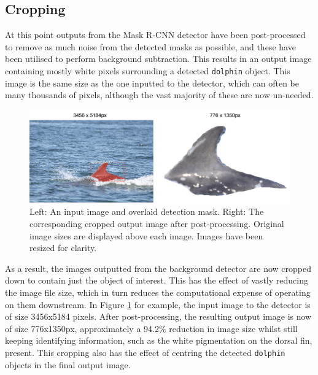 \subsection{Cropping}\label{ch:cetDet,sec:postProcessing,su:cropping}

At this point outputs from the Mask R-CNN detector have been post-processed to remove as much noise from the detected masks as possible, and these have been utilised to perform background subtraction. This results in an output image containing mostly white pixels surrounding a detected \texttt{dolphin} object. This image is the same size as the one inputted to the detector, which can often be many thousands of pixels, although the vast majority of these are now un-needed.

\begin{figure}
	\begin{center}
		\includegraphics[scale=0.5]{Chapter3/figs/190627-001-MOLS0028_-crop.png}
	\end{center}
	\caption[Left: An input image and overlaid detection mask. Right: The corresponding cropped output image after post-processing.]{Left: An input image and overlaid detection mask. Right: The corresponding cropped output image after post-processing. Original image sizes are displayed above each image. Images have been resized for clarity.}\label{fig:190627-001-MOLS0028_-crop}
\end{figure}

As a result, the images outputted from the background detector are now cropped down to contain just the object of interest. This has the effect of vastly reducing the image file size, which in turn reduces the computational expense of operating on them downstream. In Figure \ref{fig:190627-001-MOLS0028_-crop} for example, the input image to the detector is of size 3456x5184 pixels. After post-processing, the resulting output image is now of size 776x1350px, approximately a 94.2\% reduction in image size whilst still keeping identifying information,  such as the white pigmentation on the dorsal fin, present. This cropping also has the effect of centring the detected \texttt{dolphin} objects in the final output image. 

